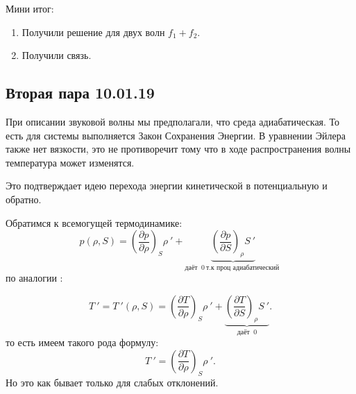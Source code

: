 \documentclass[14pt,a4paper,oneside]{extarticle}	%
\begin{document}
Мини итог:
\begin{enumerate}
	\item Получили решение для двух волн $ f_{1} + f_{2} $.
	\item Получили связь.
\end{enumerate}

\newpage

\begin{center}
	\section*{Вторая пара 10.01.19} %
\end{center}

При описании звуковой волны мы предполагали, что среда адиабатическая.
То есть для системы выполняется Закон Сохранения Энергии.
В уравнении Эйлера также нет вязкости, это не противоречит тому что в ходе распространения волны температура может изменятся.

Это подтверждает идею перехода энергии кинетической в потенциальную и обратно.

Обратимся к всемогущей термодинамике:
\begin{equation}\label{35}
p (\rho , S) = \left( \frac{\partial p}{\partial \rho}\right)_{S}  \rho\:' + \underbrace{\left( \frac{\partial p}{\partial S}\right)_{\rho}  S\:'}_{\text{даёт }\: 0 \: \text{т.к проц адиабатический }}
\end{equation}
по аналогии :

\begin{equation}\label{36}
T\:' = T\:' (\rho , S) = \left( \frac{\partial T}{\partial \rho}\right)_{S}  \rho\:' + \underbrace{\left( \frac{\partial T}{\partial S}\right)_{\rho}  S\:'}_{\text{даёт }\: 0 }.
\end{equation}
 то есть имеем такого рода формулу:
 \begin{equation}\label{37}
 T\:'= \left( \frac{\partial T}{\partial \rho}\right)_{S}  \rho\:'.
 \end{equation}
 Но это как бывает только для слабых отклонений.
 
\end{document}
